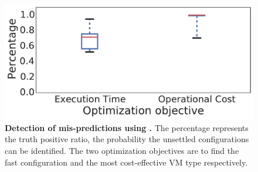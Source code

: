 \begin{figure}[!htbp]
 \includegraphics[width=.8\textwidth]{Figures/s4_misprediction_correction.pdf}
 \centering
 \caption{\textbf{Detection of mis-predictions using \scout.} The percentage represents the truth positive ratio, the probability the unsettled configurations can be identified.  The two optimization objectives are to find the fast configuration and the most cost-effective VM type respectively.}
 \label{fig:detection_misprediction}
\end{figure}